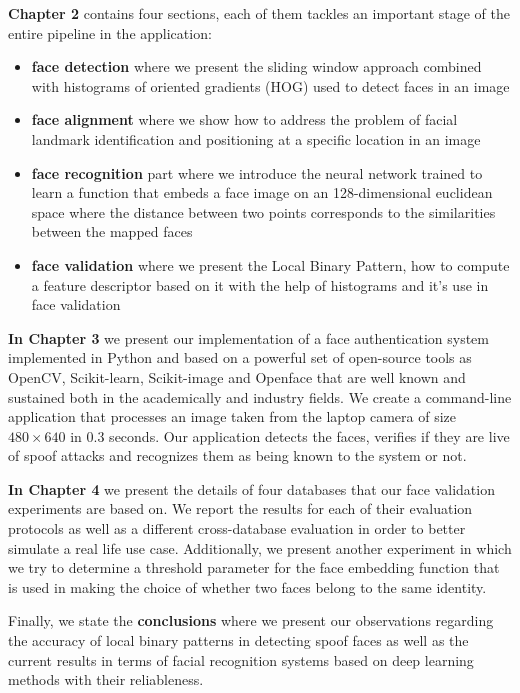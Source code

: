 \textbf{Chapter 2} contains four sections, each of them tackles an important stage of the entire pipeline in the application: 
\begin{itemize}
	\item \textbf{face detection} where we present the sliding window approach combined with histograms of oriented gradients (HOG) used to detect faces in an image
	\item \textbf{face alignment} where we show how to address the problem of facial landmark identification and positioning at a specific location in an image
	\item \textbf{face recognition} part where we introduce the neural network trained to learn a function that embeds a face image on an 128-dimensional euclidean space where the distance between two points corresponds to the similarities between the mapped faces
	\item \textbf{face validation} where we present the Local Binary Pattern, how to compute a feature descriptor based on it with the help of histograms and it's use in face validation
\end{itemize}

\textbf{In Chapter 3} we present our implementation of a face authentication system implemented in Python and based on a powerful set of open-source tools as OpenCV\cite{opencv_library}, Scikit-learn\cite{scikit-learn}, Scikit-image\cite{scikit-image} and Openface\cite{amos2016openface} that are well known and sustained both in the academically and industry fields. We create a command-line application that processes an image taken from the laptop camera of size $480\times640$ in 0.3 seconds. Our application detects the faces, verifies if they are live of spoof attacks and recognizes them as being known to the system or not.

\textbf{In Chapter 4} we present the details of four databases that our face validation experiments are based on. We report the results for each of their evaluation protocols as well as a different cross-database evaluation in order to better simulate a real life use case. Additionally, we present another experiment in which we try to determine a threshold parameter for the face embedding function that is used in making the choice of whether two faces belong to the same identity.

Finally, we state the \textbf{conclusions} where we present our observations regarding the accuracy of local binary patterns in detecting spoof faces as well as the current results in terms of facial recognition systems based on deep learning methods with their reliableness.

